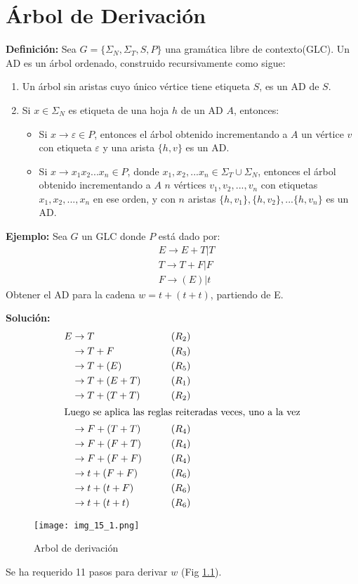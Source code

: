 \chapter{Árbol de Derivación}
\textbf{Definición: }Sea $G=\{\Sigma_N,\Sigma_T,S,P\}$ una gramática libre de contexto(GLC). Un AD es un árbol ordenado, construido recursivamente como sigue:
\begin{enumerate}
\item Un árbol sin aristas cuyo único vértice tiene etiqueta $S$, es un AD de $S$.
\item Si $x\in \Sigma_N$ es etiqueta de una hoja $h$ de un AD $A$, entonces:
	\begin{itemize}
	\item Si $x\rightarrow \varepsilon \in P$, entonces el árbol obtenido incrementando a $A$ un vértice $v$ con etiqueta $\varepsilon$ y una arista $\{h,v\}$ es un AD.
	\item Si $x\rightarrow x_1x_2...x_n \in P$, donde $x_1,x_2,...x_n \in \Sigma_T \cup \Sigma_N$, entonces el árbol obtenido incrementando a $A$ $n$ vértices $v_1,v_2,...,v_n$ con etiquetas $x_1,x_2,...,x_n$ en ese orden, y con $n$ aristas $\{h,v_1\},\{h,v_2\},...\{h,v_n\}$ es un AD. 
	\end{itemize}
\end{enumerate}

\textbf{Ejemplo: }Sea $G$ un GLC donde $P$ está dado por:
\begin{align*}
& E\rightarrow E+T|T	\\
& T\rightarrow T+F|F	\\
& F\rightarrow (E)|t
\end{align*}
Obtener el AD para la cadena $w=t+(t+t)$, partiendo de E.

\textbf{Solución: }
\begin{align*}
E	&\rightarrow T			&\qquad (R_2)\\
	&\rightarrow T+F		&\qquad (R_3)\\
	&\rightarrow T+(E)		&\qquad (R_5)\\
	&\rightarrow T+(E+T)	&\qquad (R_1)\\
	&\rightarrow T+(T+T)	&\qquad (R_2)\\
\intertext{Luego se aplica las reglas reiteradas veces, uno a la vez}
	&\rightarrow F+(T+T)	&\qquad (R_4)\\
	&\rightarrow F+(F+T)	&\qquad (R_4)\\
	&\rightarrow F+(F+F)	&\qquad (R_4)\\
	&\rightarrow t+(F+F)	&\qquad (R_6)\\
	&\rightarrow t+(t+F)	&\qquad (R_6)\\
	&\rightarrow t+(t+t)	&\qquad (R_6)
\end{align*}
\begin{figure}[h!]
\centering
\texttt{[image: img\_15\_1.png]}
\caption{Arbol de derivación}\label{img_15_1}
\end{figure}
Se ha requerido 11 pasos para derivar $w$ (Fig \ref{img_15_1}).


